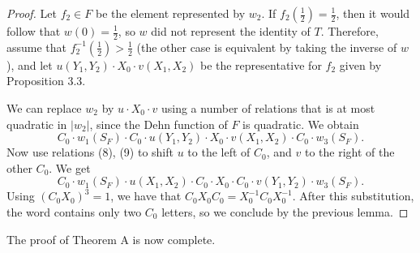 \begin{proof}
Let $f_2\in F$ be the element represented by $w_2$. If $f_2(\frac12)=\frac12$, then it would follow that $w(0)=\frac12$, so $w$ did not represent the identity of $T$. Therefore, assume that $f_2^{-1}(\frac12)>\frac12$ (the other case is equivalent by taking the inverse of $w$), and let $u(Y_1,Y_2)\cdot X_0\cdot v(X_1,X_2)$ be the representative for $f_2$ given by Proposition 3.3.

We can replace $w_2$ by $u\cdot X_0\cdot v$ using a number of relations that is at most quadratic in $|w_2|$, since the Dehn function of $F$ is quadratic. We obtain
\[
C_0\cdot w_1(S_F)\cdot C_0\cdot u(Y_1,Y_2)\cdot X_0\cdot v(X_1,X_2)\cdot C_0\cdot w_3(S_F).
\]
Now use relations (8), (9) to shift $u$ to the left of $C_0$, and $v$ to the right of the other $C_0$. We get
\[
C_0\cdot w_1(S_F)\cdot u(X_1,X_2)\cdot C_0\cdot X_0\cdot C_0\cdot v(Y_1,Y_2)\cdot w_3(S_F).
\]
Using $(C_0X_0)^3=1$, we have that $C_0X_0C_0=X_0^{-1}C_0X_0^{-1}$. After this substitution, the word contains only two $C_0$ letters, so we conclude by the previous lemma.
\end{proof}
The proof of Theorem A is now complete.

